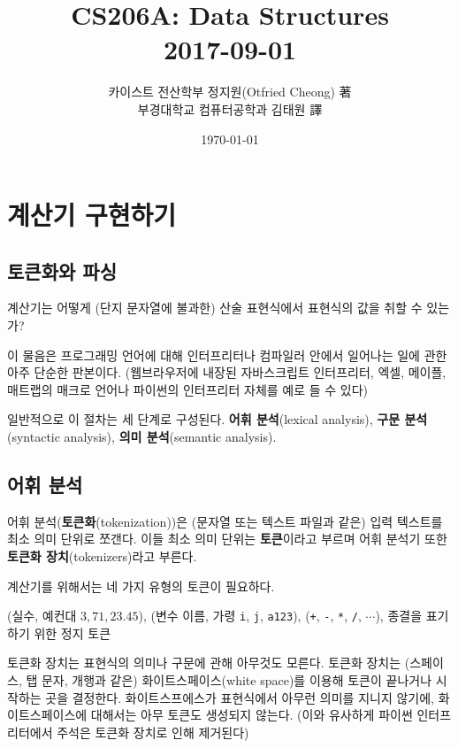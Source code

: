 \documentclass[a4paper]{oblivoir}
\title{CS206A: Data Structures\\2017-09-01}
\author{카이스트 전산학부 정지원(Otfried Cheong) 著\\부경대학교 컴퓨터공학과 김태원 譯}
\date{\today}
\begin{document}
\maketitle

\section*{계산기 구현하기}

\subsection*{토큰화와 파싱}

계산기는 어떻게 (단지 문자열에 불과한) 산술 표현식에서 표현식의 값을 취할 수 있는가?

이 물음은 프로그래밍 언어에 대해 인터프리터나 컴파일러 안에서 일어나는 일에 관한 아주 단순한 판본이다. (웹브라우저에 내장된 자바스크립트 인터프리터, 엑셀, 메이플, 매트랩의 매크로 언어나 파이썬의 인터프리터 자체를 예로 들 수 있다)

일반적으로 이 절차는 세 단계로 구성된다. \textbf{어휘 분석}(lexical analysis), \textbf{구문 분석}(syntactic analysis), \textbf{의미 분석}(semantic analysis).

\subsection*{어휘 분석}

어휘 분석(\textbf{토큰화}(tokenization))은 (문자열 또는 텍스트 파일과 같은) 입력 텍스트를 최소 의미 단위로 쪼갠다. 이들 최소 의미 단위는 \textbf{토큰}이라고 부르며 어휘 분석기 또한 \textbf{토큰화 장치}(tokenizers)라고 부른다.

계산기를 위해서는 네 가지 유형의 토큰이 필요하다.

\begin{itemize}
     (실수, 예컨대 $3, 71, 23.45$),
     (변수 이름, 가령 \texttt{i}, \texttt{j}, \texttt{a123}),
     (\texttt{+}, \texttt{-}, \texttt{*}, \texttt{/}, $\cdots$),
     종결을 표기하기 위한 정지 토큰
\end{itemize}

토큰화 장치는 표현식의 의미나 구문에 관해 아무것도 모른다. 토큰화 장치는 (스페이스, 탭 문자, 개행과 같은) 화이트스페이스(white space)를 이용해 토큰이 끝나거나 시작하는 곳을 결정한다. 화이트스프에스가 표현식에서 아무런 의미를 지니지 않기에, 화이트스페이스에 대해서는 아무 토큰도 생성되지 않는다. (이와 유사하게 파이썬 인터프리터에서 주석은 토큰화 장치로 인해 제거된다)
\end{document}
